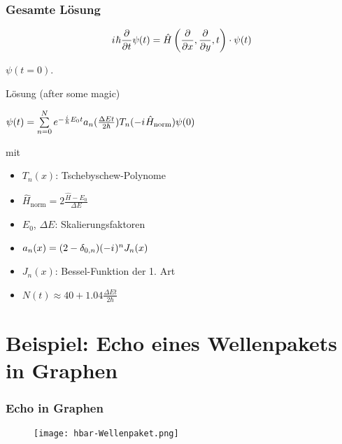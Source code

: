 \documentclass{beamer}
\newcommand{\iu}{{i\mkern1mu}} 	%
\begin{document}
\begin{frame}[t] %
  \frametitle{Gesamte Lösung}
  \vskip-5mm
    \begin{equation*}
      \iu \hbar \frac{\partial}{\partial t}  \psi(t) = \hat{H}\left(\frac{\partial}{\partial x}, \frac{\partial}{\partial y}, t\right) \cdot \psi(t) 
    \end{equation*}
  
      $\psi(t=0)$.
    \begin{block}{Lösung (after some magic)}
  \begin{center}$\psi(t) = \sum\limits_{n=0}^N e^{-\frac{\iu}{\hbar}E_0 t} a_n(\frac{\Delta E t}{2\hbar}) T_n(-\iu\hat{H}_\text{norm})\psi(0)$\end{center}
    \end{block}     
  mit

    \begin{itemize}
  \item $T_n(x)$: Tschebyschew-Polynome
  \item $\hat{H}_\text{norm} = 2 \frac{\hat{H}-E_0}{\Delta E}$
  \item $E_0$, $\Delta E$: Skalierungsfaktoren 
  \item $a_n(x) = (2-\delta_{0,n})(-\iu)^n J_n(x)$
  \item $J_n(x)$: Bessel-Funktion der 1. Art
  \item $N(t) \approx 40 + 1.04 \frac{\Delta E t}{2\hbar}$
    \end{itemize}
\end{frame}

\section{Beispiel: Echo eines Wellenpakets in Graphen}
\begin{frame}[t]%
  \vskip-3mm
  \frametitle{Echo in Graphen}
     \begin{figure}\centering
      \texttt{[image: hbar-Wellenpaket.png]}
     \end{figure} 
 \end{frame}
\end{document}
